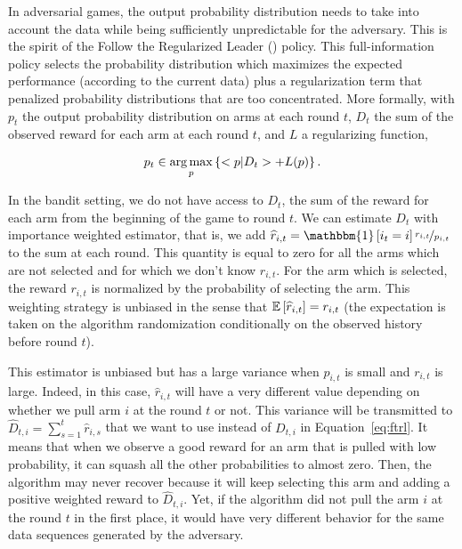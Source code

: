 {In adversarial games, the output probability distribution needs to take into account the data while being sufficiently unpredictable for the adversary. This is the spirit of the Follow the Regularized Leader (\FTRL) policy. This full-information policy selects the probability distribution which maximizes the expected performance (according to the current data) plus a regularization term that penalized probability distributions that are too concentrated. More formally, with $p_t$ the output probability distribution on arms at each round $t$, $D_t$ the sum of the observed reward for each arm at each round $t$, and $L$ a regularizing function,

\begin{equation}
\label{eq:ftrl}
p_t \in \operatorname*{arg\,max}_p \left\{ < p | D_t > + L(p)\right\}.
\end{equation}

In the bandit setting, we do not have access to $D_t$, the sum of the reward for each arm from the beginning of the game to round $t$. We can estimate $D_t$ with importance weighted estimator, that is, we add $\hat{r}_{i,t} = \mathbbm{1}\left[i_t =i \right] \nicefrac{r_{i,t}}{p_{i,t}}$ to the sum at each round. This quantity is equal to zero for all the arms which are not selected and for which we don't know $r_{i,t}$. For the arm which is selected, the reward $r_{i,t}$ is normalized by the probability of selecting the arm. This weighting strategy is unbiased in the sense that $\mathbb{E}\left[\widehat{r}_{i,t}\right] = r_{i,t}$ (the expectation is taken on the algorithm randomization conditionally on the observed history before round $t$).

This estimator is unbiased but has a large variance when $p_{i,t}$ is small and $r_{i,t}$ is large. Indeed, in this case, $\hat{r}_{i,t}$ will have a very different value depending on whether we pull arm $i$ at the round $t$ or not. This variance will be transmitted to $\hat{D}_{t,i} = \sum_{s=1}^t \hat{r}_{i,s}$ that we want to use instead of $D_{t,i}$ in Equation~\ref{eq:ftrl}. It means that when we observe a good reward for an arm that is pulled with low probability, it can squash all the other probabilities to almost zero. Then, the algorithm may never recover because it will keep selecting this arm and adding a positive weighted reward to $\hat{D}_{t,i}$. Yet, if the algorithm did not pull the arm $i$ at the round $t$ in the first place, it would have very different behavior for the same data sequences generated by the adversary. 

}
